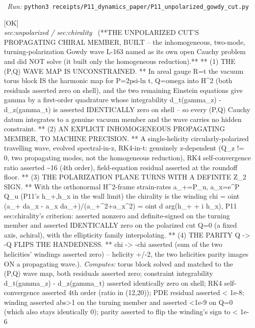 \begin{description}
\ \emph{Run:} \texttt{python3 receipts/P11\_dynamics\_paper/P11\_unpolarized\_gowdy\_cut.py}
\item[\label{rcpt:P11_propagating_chiral_member}\texttt{P11\_propagating\_chiral\_member}]\hfill\textsf{[OK]}\\
\textit{sec:unpolarized / sec:chirality} \ (**THE UNPOLARIZED CUT'S PROPAGATING CHIRAL MEMBER, BUILT -- the inhomogeneous, two-mode, turning-polarization Gowdy wave L-163 named as its own open Cauchy problem and did NOT solve (it built only the homogeneous reduction).** ** (1) THE (P,Q) WAVE MAP IS UNCONSTRAINED. ** In areal gauge R=t the vacuum torus block IS the harmonic map for P=2psi-ln t, Q=omega into H\textasciicircum{}2 (both residuals asserted zero on shell), and the two remaining Einstein equations give gamma by a first-order quadrature whose integrability d\_t(gamma\_z) - d\_z(gamma\_t) is asserted IDENTICALLY zero on shell -- so every (P,Q) Cauchy datum integrates to a genuine vacuum member and the wave carries no hidden constraint. ** (2) AN EXPLICIT INHOMOGENEOUS PROPAGATING MEMBER, TO MACHINE PRECISION. ** A single-helicity circularly-polarized travelling wave, evolved spectral-in-z, RK4-in-t: genuinely z-dependent (Q\_z != 0, two propagating modes, not the homogeneous reduction), RK4 self-convergence ratio asserted \textasciitilde{}16 (4th order), field-equation residual asserted at the roundoff floor. ** (3) THE POLARIZATION PLANE TURNS WITH A DEFINITE Z\_2 SIGN. ** With the orthonormal H\textasciicircum{}2-frame strain-rates a\_+=P\_u, a\_x=e\textasciicircum{}P Q\_u (P11's h\_+,h\_x in the wall limit) the chirality is the winding chi = oint (a\_+ da\_x - a\_x da\_+)/(a\_+\textasciicircum{}2+a\_x\textasciicircum{}2) = oint d arg(h\_+ + i h\_x), P11 sec:chirality's criterion: asserted nonzero and definite-signed on the turning member and asserted IDENTICALLY zero on the polarized cut Q=0 (a fixed axis, achiral), with the ellipticity family interpolating. ** (4) THE PARITY Q -> -Q FLIPS THE HANDEDNESS. ** chi -> -chi asserted (sum of the two helicities' windings asserted zero) -- helicity +/-2, the two helicities parity images ON a propagating wave.). 
\emph{Computes:} torus block solved and matched to the (P,Q) wave map, both residuals asserted zero; constraint integrability d\_t(gamma\_z) - d\_z(gamma\_t) asserted identically zero on shell; RK4 self-convergence asserted 4th order (ratio in (12,20)); PDE residual asserted < 1e-8; winding asserted abs>1 on the turning member and asserted <1e-9 on Q=0 (which also stays identically 0); parity asserted to flip the winding's sign to < 1e-6

\end{description}
